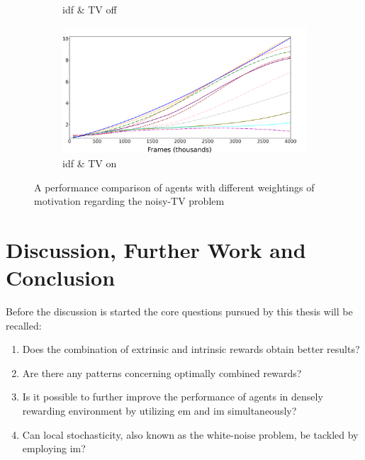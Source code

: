 \documentclass[draft,final]{vutinfth} %
\begin{document}
\begin{figure}[h]
\begin{adjustwidth}{-3.0cm}{-2.0cm}
\begin{subfigure}[t]{0.5\linewidth}
                \caption{\acrlong{idf} \& TV off}
            \end{subfigure}
            \begin{subfigure}[t]{0.5\linewidth}
                \centering
                \includegraphics[width=1\textwidth]{figures/breakout/tv/idf_TV.png}
                \caption{\acrlong{idf} \& TV on}
            \end{subfigure}
        \end{adjustwidth}
        \caption{A performance comparison of agents with different weightings of motivation regarding the noisy-TV problem}
        \label{fig:tv_problem}
    \end{figure}

    \glsresetall


    \chapter{Discussion, Further Work and Conclusion}\label{ch:discussion-and-further-work}

    Before the discussion is started the core questions pursued by this thesis will be recalled:

    \begin{enumerate}[label=(\alph*)]
        \item \label{q:a}Does the combination of extrinsic and intrinsic rewards obtain better results?
        \item \label{q:b}Are there any patterns concerning optimally combined rewards?
        \item \label{q:c}Is it possible to further improve the performance of agents in densely rewarding environment by utilizing \acrlong{em} and \acrlong{im} simultaneously?
        \item \label{q:d}Can local stochasticity, also known as the white-noise problem, be tackled by employing \acrlong{im}?
    \end{enumerate}
\end{document}
